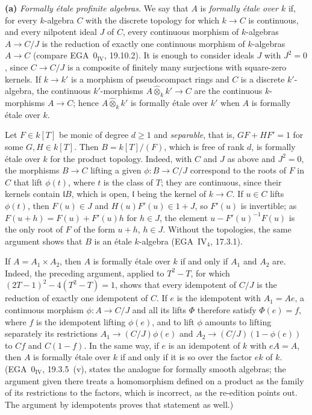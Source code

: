\smallskip
\noindent\textbf{(a)}
\label{sga3:VIIB:1.6.A}
\emph{Formally étale profinite algebras.} We say that \(A\) is
\emph{formally étale over \(k\)} if, for every \(k\)-algebra \(C\)
with the discrete topology for which \(k\to C\) is continuous, and
every nilpotent ideal \(J\) of \(C\), every continuous morphism of
\(k\)-algebras \(A\to C/J\) is the reduction of exactly one continuous
morphism of \(k\)-algebras \(A\to C\) \textup{(compare
EGA~\(0_{\mathrm{IV}}\), 19.10.2)}. It is enough to consider ideals
\(J\) with \(J^2=0\), since \(C\to C/J\) is a composite of finitely
many surjections with square-zero kernels. If \(k\to k'\) is a
morphism of pseudocompact rings and \(C\) is a discrete
\(k'\)-algebra, the continuous \(k'\)-morphisms
\(A\widehat\otimes_kk'\to C\) are the continuous \(k\)-morphisms
\(A\to C\); hence \(A\widehat\otimes_kk'\) is formally étale over
\(k'\) when \(A\) is formally étale over \(k\).

Let \(F\in k[T]\) be monic of degree \(d\geq1\) and \emph{separable},
that is, \(GF+HF'=1\) for some \(G,H\in k[T]\). Then
\(B=k[T]/(F)\), which is free of rank \(d\), is formally étale over
\(k\) for the product topology. Indeed, with \(C\) and \(J\) as above
and \(J^2=0\), the morphisms \(B\to C\) lifting a given
\(\phi:B\to C/J\) correspond to the roots of \(F\) in \(C\) that lift
\(\phi(t)\), where \(t\) is the class of \(T\); they are continuous,
since their kernels contain \(\mathfrak lB\), which is open,
\(\mathfrak l\) being the kernel of \(k\to C\). If \(u\in C\) lifts
\(\phi(t)\), then \(F(u)\in J\) and \(H(u)F'(u)\in1+J\), so \(F'(u)\)
is invertible; as \(F(u+h)=F(u)+F'(u)h\) for \(h\in J\), the element
\(u-F'(u)^{-1}F(u)\) is the only root of \(F\) of the form \(u+h\),
\(h\in J\). Without the topologies, the same argument shows that \(B\)
is an étale \(k\)-algebra \textup{(EGA~\(\mathrm{IV}_4\), 17.3.1)}.

If \(A=A_1\times A_2\), then \(A\) is formally étale over \(k\) if and
only if \(A_1\) and \(A_2\) are. Indeed, the preceding argument,
applied to \(T^2-T\), for which \((2T-1)^2-4(T^2-T)=1\), shows that
every idempotent of \(C/J\) is the reduction of exactly one idempotent
of \(C\). If \(e\) is the idempotent with \(A_1=Ae\), a continuous
morphism \(\phi:A\to C/J\) and all its lifts \(\Phi\) therefore satisfy
\(\Phi(e)=f\), where \(f\) is the idempotent lifting \(\phi(e)\), and to
lift \(\phi\) amounts to lifting separately its restrictions
\(A_1\to(C/J)\phi(e)\) and \(A_2\to(C/J)(1-\phi(e))\) to \(Cf\) and
\(C(1-f)\). In the same way, if \(e\) is an idempotent of \(k\) with
\(eA=A\), then \(A\) is formally étale over \(k\) if and only if it is
so over the factor \(ek\) of \(k\). \textup{(EGA~\(0_{\mathrm{IV}}\),
19.3.5~(v), states the analogue for formally smooth algebras; the
argument given there treats a homomorphism defined on a product as the
family of its restrictions to the factors, which is incorrect, as the
re-edition points out. The argument by idempotents proves that
statement as well.)}

